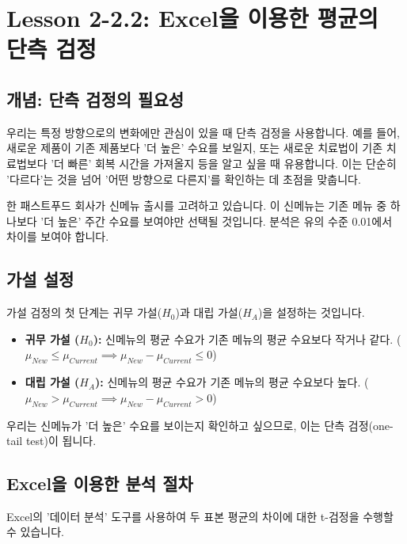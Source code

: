 \documentclass[11pt,a4paper]{article}
\theoremstyle{definition}
\begin{document}
\newpage
\section{Lesson 2-2.2: Excel을 이용한 평균의 단측 검정}

\subsection{개념: 단측 검정의 필요성}
우리는 특정 방향으로의 변화에만 관심이 있을 때 단측 검정을 사용합니다. 예를 들어, 새로운 제품이 기존 제품보다 '더 높은' 수요를 보일지, 또는 새로운 치료법이 기존 치료법보다 '더 빠른' 회복 시간을 가져올지 등을 알고 싶을 때 유용합니다. 이는 단순히 '다르다'는 것을 넘어 '어떤 방향으로 다른지'를 확인하는 데 초점을 맞춥니다.

\begin{examplebox}[title=시나리오: 패스트푸드 신메뉴 출시]
한 패스트푸드 회사가 신메뉴 출시를 고려하고 있습니다. 이 신메뉴는 기존 메뉴 중 하나보다 '더 높은' 주간 수요를 보여야만 선택될 것입니다. 분석은 유의 수준 0.01에서 차이를 보여야 합니다.
\end{examplebox}

\subsection{가설 설정}
가설 검정의 첫 단계는 귀무 가설($H_0$)과 대립 가설($H_A$)을 설정하는 것입니다.

\begin{itemize}
    \item \textbf{귀무 가설 ($H_0$):} 신메뉴의 평균 수요가 기존 메뉴의 평균 수요보다 작거나 같다.
    ($\mu_{New} \le \mu_{Current} \implies \mu_{New} - \mu_{Current} \le 0$)
    \item \textbf{대립 가설 ($H_A$):} 신메뉴의 평균 수요가 기존 메뉴의 평균 수요보다 높다.
    ($\mu_{New} > \mu_{Current} \implies \mu_{New} - \mu_{Current} > 0$)
\end{itemize}
우리는 신메뉴가 '더 높은' 수요를 보이는지 확인하고 싶으므로, 이는 단측 검정(one-tail test)이 됩니다.

\subsection{Excel을 이용한 분석 절차}
Excel의 '데이터 분석' 도구를 사용하여 두 표본 평균의 차이에 대한 t-검정을 수행할 수 있습니다.
\end{document}
